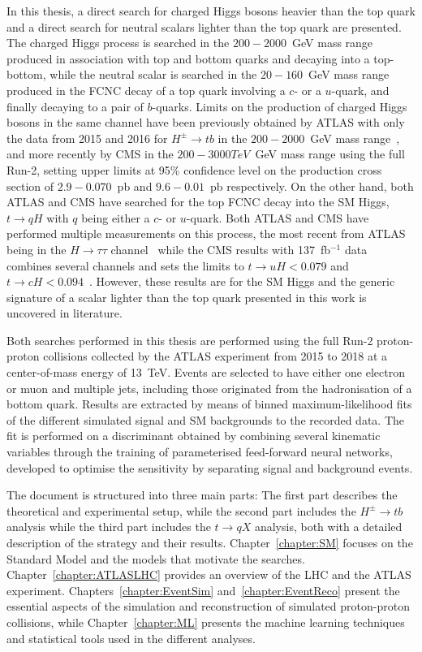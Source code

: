 In this thesis, a direct search for charged Higgs bosons heavier than the top quark and a direct search for neutral scalars lighter than the top quark are presented. The charged Higgs process is searched in the $200-2000$~GeV mass range produced in association with top and bottom quarks and decaying into a top-bottom, while the neutral scalar is searched in the $20-160$~GeV mass range produced in the FCNC decay of a top quark involving a $c$- or a $u$-quark, and finally decaying to a pair of $b$-quarks. Limits on the production of charged Higgs bosons in the same channel have been previously obtained by ATLAS with only the data from 2015 and 2016 for $H^\pm\to tb$ in the $200-2000$~GeV mass range~\cite{ATLASHptb2018}, and more recently by CMS in the $200-3000 TeV$~GeV mass range using the full Run-2, setting upper limits at 95\% confidence level on the production cross section of $2.9-0.070$~pb and $9.6-0.01$~pb respectively. On the other hand, both ATLAS and CMS have searched for the top FCNC decay into the SM Higgs, $t\to qH$ with $q$ being either a $c$- or $u$-quark. Both ATLAS and CMS have performed multiple measurements on this process, the most recent from ATLAS being in the $H\to\tau\tau$ channel~\cite{ATLAStqHtautau} while the CMS results with 137~fb$^{-1}$ data combines several channels and sets the limits to $t\to uH < 0.079$ and $t\to cH < 0.094$~\cite{CMStqHRun2}. However, these results are for the SM Higgs and the generic signature of a scalar lighter than the top quark presented in this work is uncovered in literature.

Both searches performed in this thesis are performed using the full Run-2 proton-proton collisions collected by the ATLAS experiment from 2015 to 2018 at a center-of-mass energy of 13~TeV. Events are selected to have either one electron or muon and multiple jets, including those originated from the hadronisation of a bottom quark. Results are extracted by means of binned maximum-likelihood fits of the different simulated signal and SM backgrounds to the recorded data. The fit is performed on a discriminant obtained by combining several kinematic variables through the training of parameterised feed-forward neural networks, developed to optimise the sensitivity by separating signal and background events.

The document is structured into three main parts: The first part describes the theoretical and experimental setup, while the second part includes the $H^\pm\to tb$ analysis while the third part includes the $t\to qX$ analysis, both with a detailed description of the strategy and their results. Chapter~\ref{chapter:SM} focuses on the Standard Model and the models that motivate the searches. Chapter~\ref{chapter:ATLASLHC} provides an overview of the LHC and the ATLAS experiment. Chapters~\ref{chapter:EventSim} and~\ref{chapter:EventReco} present the essential aspects of the simulation and reconstruction of simulated proton-proton collisions, while Chapter~\ref{chapter:ML} presents the machine learning techniques and statistical tools used in the different analyses. 